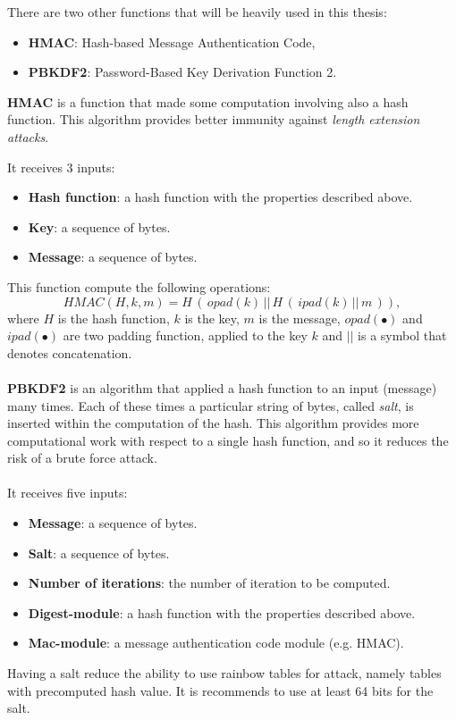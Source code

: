 There are two other functions that will be heavily used in this thesis:
\begin{itemize}
	\item \textbf{HMAC}: Hash-based Message Authentication Code,
	\item \textbf{PBKDF2}: Password-Based Key Derivation Function 2.
\end{itemize}
\begin{flushleft}
	\textbf{HMAC} is a function that made some computation involving also a hash function. This algorithm provides better immunity against \textit{length extension attacks}.
\end{flushleft}
It receives 3 inputs:
\begin{itemize}[label=$\odot$]
	\item \textbf{Hash function}: a hash function with the properties described above.
	\item \textbf{Key}: a sequence of bytes.
	\item \textbf{Message}: a sequence of bytes.
\end{itemize}
This function compute the following operations:
\begin{equation*}
HMAC(H,k,m)=H\, (\, opad(k) \, ||\, H\, (\, ipad(k) \, ||\,  m \, )),
\end{equation*}
where $H$ is the hash function, $k$ is the key, $m$ is the message, $opad(\bullet)$ and $ipad(\bullet)$ are two padding function, applied to the key $k$ and $||$ is a symbol that denotes concatenation.
\\ \\
\textbf{PBKDF2} is an algorithm that applied a hash function to an input (message) many times. Each of these times a particular string of bytes, called \textit{salt}, is inserted within the computation of the hash. This algorithm provides more computational work with respect to a single hash function, and so it reduces the risk of a brute force attack.
\\ \\
It receives five inputs:
\begin{itemize}[label=$\odot$]
	\item \textbf{Message}: a sequence of bytes.
	\item \textbf{Salt}: a sequence of bytes.
	\item \textbf{Number of iterations}: the number of iteration to be computed.
	\item \textbf{Digest-module}: a hash function with the properties described above.
	\item \textbf{Mac-module}: a message authentication code  module (e.g. HMAC).
\end{itemize}
Having a salt reduce the ability to use rainbow tables for attack, namely tables with precomputed hash value. It is recommends to use at least 64 bits for the salt.







